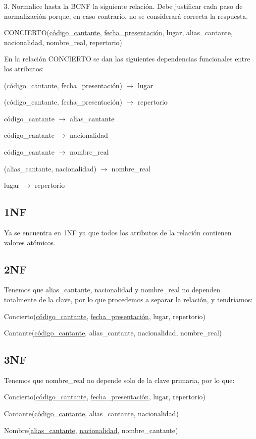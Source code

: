 
3. Normalice hasta la BCNF la siguiente relación. Debe justificar cada paso de normalización porque, en caso contrario, no se considerará correcta la respuesta.

CONCIERTO(\underline{código\_cantante}, \underline{fecha\_presentación}, lugar, alias\_cantante, nacionalidad, nombre\_real, repertorio)

En la relación CONCIERTO se dan las siguientes dependencias funcionales entre los atributos:

(código\_cantante, fecha\_presentación) $\rightarrow$ lugar

(código\_cantante, fecha\_presentación) $\rightarrow$ repertorio

código\_cantante $\rightarrow$ alias\_cantante

código\_cantante $\rightarrow$ nacionalidad

código\_cantante $\rightarrow$ nombre\_real

(alias\_cantante, nacionalidad) $\rightarrow$ nombre\_real

lugar $\rightarrow$ repertorio


\subsection*{1NF}
Ya se encuentra en 1NF ya que todos los atributos de la relación contienen valores atómicos.


\subsection*{2NF}
Tenemos que alias\_cantante, nacionalidad y nombre\_real no dependen totalmente de la clave, por lo que procedemos a separar la relación, y tendríamos:

Concierto(\underline{código\_cantante}, \underline{fecha\_presentación}, lugar, repertorio)

Cantante(\underline{código\_cantante}, alias\_cantante, nacionalidad, nombre\_real)


\subsection*{3NF}
Tenemos que nombre\_real no depende solo de la clave primaria, por lo que:

Concierto(\underline{código\_cantante}, \underline{fecha\_presentación}, lugar, repertorio)

Cantante(\underline{código\_cantante}, alias\_cantante, nacionalidad)

Nombre(\underline{alias\_cantante}, \underline{nacionalidad}, nombre\_cantante)


